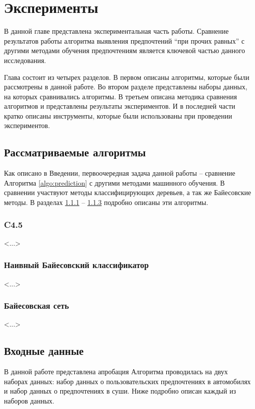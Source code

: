 \chapter{Эксперименты}
\label{chapter:experiments}
В данной главе представлена экспериментальная часть работы. Сравнение результатов работы алгоритма выявления предпочтений \enquote{при прочих равных} с другими методами обучения предпочтениям является ключевой частью данного исследования.

Глава состоит из четырех разделов. В первом описаны алгоритмы, которые были рассмотрены в данной работе. Во втором разделе представлены наборы данных, на которых сравнивались алгоритмы. В третьем описана методика сравнения алгоритмов и представлены результаты экспериментов. И в последней части кратко описаны инструменты, которые были использованы при проведении экспериментов.

\section{Рассматриваемые алгоритмы}

Как описано в Введении, первоочередная задача данной работы – сравнение Алгоритма \ref{algo:prediction} с другими методами машинного обучения. В сравнении участвуют методы классифицирующих деревьев, а так же Байесовские методы. В разделах \ref{subsec:c4.5} -- \ref{subsec:bayes_net} подробно описаны эти алгоритмы.

	\subsection{C4.5}
	\label{subsec:c4.5}
	<...>
	
	\subsection{Наивный Байесовский классификатор}
	\label{subsec:naive_bayes}
	<...>
	
	\subsection{Байесовская сеть}
	\label{subsec:bayes_net}
	<...>

\section{Входные данные}
	В данной работе представлена
	апробация Алгоритма проводилась на двух наборах данных: набор данных о пользовательских предпочтениях в автомобилях и набор данных о предпочтениях в суши. Ниже подробно описан каждый из наборов данных.
	
